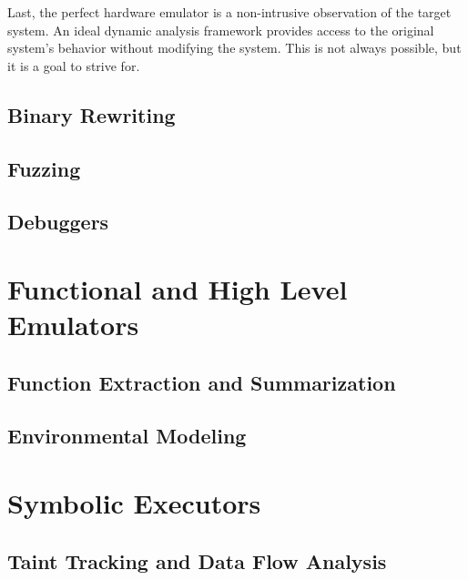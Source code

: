 Last, the perfect hardware emulator is a non-intrusive observation of the target system.
An ideal dynamic analysis framework provides access to the original system's behavior without modifying the system.
This is not always possible, but it is a goal to strive for.

\subsection{Binary Rewriting}

\subsection{Fuzzing}

\subsection{Debuggers}


\section{Functional and High Level Emulators}

\subsection{Function Extraction and Summarization}

\subsection{Environmental Modeling}

\section{Symbolic Executors}

\subsection{Taint Tracking and Data Flow Analysis}
